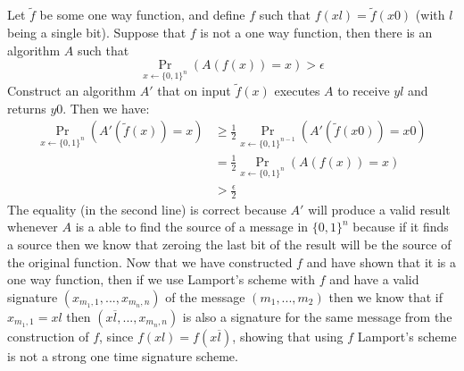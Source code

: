 \documentclass{article}
\begin{document}
\section{}%
Let $\tilde{f}$ be some one way function, and define $f$ such that $f(xl) = \tilde{f}(x0)$ (with $l$ being a single bit).
Suppose that $f$ is not a one way function, then there is an algorithm $A$ such that 
\[\Pr_{x\leftarrow \{0,1\}^n}(A(f(x)) = x) > \epsilon\]
Construct an algorithm $A'$ that on input $\tilde{f}(x)$ executes $A$ to receive $yl$ and returns $y0$.
Then we have:
\begin{align*}
\Pr_{x\leftarrow \{0,1\}^n}(A'(\tilde{f}(x)) = x) &\geq \frac{1}{2}\Pr_{x\leftarrow \{0,1\}^{n-1}}(A'(\tilde{f}(x0)) = x0)\\
&= \frac{1}{2}\Pr_{x\leftarrow \{0,1\}^{n}}(A(f(x)) = x)\\
&>\frac{\epsilon}{2}
\end{align*}
The equality (in the second line) is correct because $A'$ will produce a valid result whenever $A$ is a able to find the source of a message in $\{0,1\}^{n}$ because if it finds a source then we know that zeroing the last bit of the result will be the source of the original function.
Now that we have constructed $f$ and have shown that it is a one way function, then if we use Lamport’s scheme with $f$ and have a valid signature $(x_{m_1, 1}, ..., x_{m_n, n})$ of the message $(m_1, ... , m_2)$ then we know that if $x_{m_1, 1} = xl$ then  $(x\overline{l}, ..., x_{m_n, n})$ is also a signature for the same message from the construction of $f$, since $f(xl) = f(x\overline{l})$, showing that using $f$ Lamport’s scheme is not a strong one time signature scheme.
\end{document}
